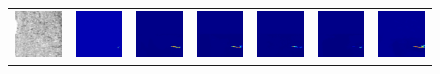 \documentclass[sn-mathphys]{sn-jnl}%
\theoremstyle{thmstyleone}%
\theoremstyle{thmstyletwo}%
\theoremstyle{thmstylethree}%
\begin{document}
\begin{figure}
{\begin{tabular}{p{1.5cm}p{1.5cm}p{1.5cm}p{1.5cm}p{1.5cm}p{1.5cm}p{1.5cm}}
    \includegraphics[width=0.65in]{fig11-1-input.png}& 
    \includegraphics[width=0.65in]{fig11-1-ori.png}& 
    \includegraphics[width=0.65in]{fig11-1-cutmix.png}& 
    \includegraphics[width=0.65in]{fig11-1-cutout.png}& 
    \includegraphics[width=0.65in]{fig11-1-has.png}& 
    \includegraphics[width=0.65in]{fig11-1-gridmask.png}& 
    \includegraphics[width=0.65in]{fig11-1-ours.png} \\


\end{tabular}}
\end{figure}
\end{document}
